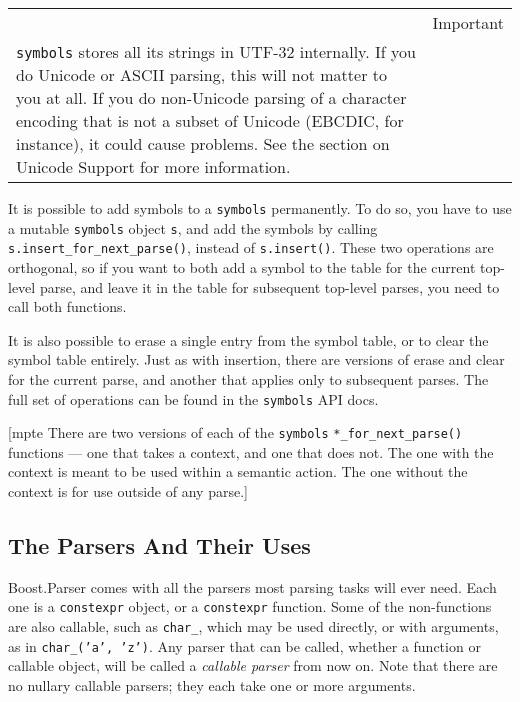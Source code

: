 \begin{longtable}[]{@{}
  >{\raggedright\arraybackslash}p{}
  >{\raggedright\arraybackslash}p{}@{}}
\toprule\noalign{}
\endhead
\bottomrule\noalign{}
\endlastfoot
\begin{minipage}[t]{\linewidth}\raggedright
\end{minipage} & Important \\
\texttt{symbols} stores all its strings in UTF-32 internally. If you do Unicode or ASCII parsing, this will not matter to you at all. If you do non-Unicode parsing of a character encoding that is not a subset of Unicode (EBCDIC, for instance), it could cause problems. See the section on Unicode Support for more information. & \\
\end{longtable}

It is possible to add symbols to a \texttt{symbols} permanently. To do so, you have to use a mutable \texttt{symbols} object \texttt{s}, and add the symbols by calling \texttt{s.insert\_for\_next\_parse()}, instead of \texttt{s.insert()}. These two operations are orthogonal, so if you want to both add a symbol to the table for the current top-level parse, and leave it in the table for subsequent top-level parses, you need to call both functions.

It is also possible to erase a single entry from the symbol table, or to clear the symbol table entirely. Just as with insertion, there are versions of erase and clear for the current parse, and another that applies only to subsequent parses. The full set of operations can be found in the \texttt{symbols} API docs.

{[}mpte There are two versions of each of the \texttt{symbols} \texttt{*\_for\_next\_parse()} functions --- one that takes a context, and one that does not. The one with the context is meant to be used within a semantic action. The one without the context is for use outside of any parse.{]}

\subsection{The Parsers And Their Uses}

Boost.Parser comes with all the parsers most parsing tasks will ever need. Each one is a \texttt{constexpr} object, or a \texttt{constexpr} function. Some of the non-functions are also callable, such as \texttt{char\_}, which may be used directly, or with arguments, as in \texttt{char\_}\texttt{('a', 'z')}. Any parser that can be called, whether a function or callable object, will be called a \emph{callable parser} from now on. Note that there are no nullary callable parsers; they each take one or more arguments.

